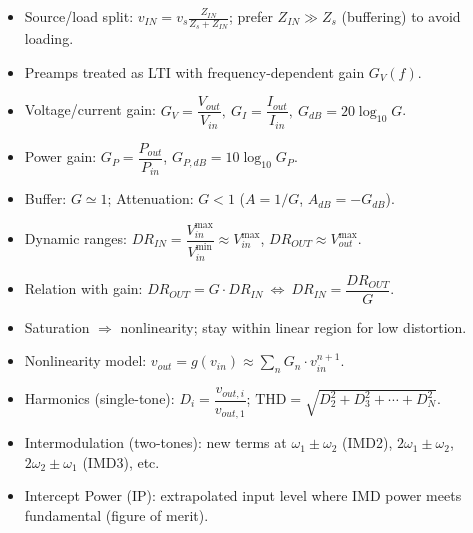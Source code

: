 \begin{tcolorbox}[colback=gray!10,colframe=black,title=Summary: Audio Path & Impedance]
\begin{itemize}
\item Source/load split: $\displaystyle v_{IN}=v_s\frac{Z_{IN}}{Z_s+Z_{IN}}$; prefer $Z_{IN}\gg Z_s$ (buffering) to avoid loading.
\item Preamps treated as LTI with frequency-dependent gain $G_V(f)$.
\end{itemize}
\end{tcolorbox}

\begin{tcolorbox}[colback=gray!10,colframe=black,title=Summary: Gains & dB]
\begin{itemize}
\item Voltage/current gain: $G_V=\dfrac{V_{out}}{V_{in}}, \ G_I=\dfrac{I_{out}}{I_{in}}, \ G_{dB}=20\log_{10}G$.
\item Power gain: $G_P=\dfrac{P_{out}}{P_{in}}$, $G_{P,dB}=10\log_{10}G_P$.
\item Buffer: $G\simeq1$; Attenuation: $G<1$ ($A=1/G$, $A_{dB}=-G_{dB}$).
\end{itemize}
\end{tcolorbox}

\begin{tcolorbox}[colback=gray!10,colframe=black,title=Summary: Dynamic Range & Saturation]
\begin{itemize}
\item Dynamic ranges: $DR_{IN}=\dfrac{V_{in}^{\max}}{V_{in}^{\min}}\approx V_{in}^{\max}$, 
$DR_{OUT}\approx V_{out}^{\max}$.
\item Relation with gain: $DR_{OUT}=G\cdot DR_{IN} \ \Leftrightarrow \ DR_{IN}=\dfrac{DR_{OUT}}{G}$.
\item Saturation $\Rightarrow$ nonlinearity; stay within linear region for low distortion.
\end{itemize}
\end{tcolorbox}

\begin{tcolorbox}[colback=gray!10,colframe=black,title=Summary: Distortion, THD & IMD]
\begin{itemize}
\item Nonlinearity model: $v_{out}=g(v_{in})\approx \sum_{n}G_n \cdot v_{in}^{n+1}$.
\item Harmonics (single-tone): $D_i=\dfrac{v_{out,i}}{v_{out,1}}$; $\displaystyle \mathrm{THD}=\sqrt{D_2^2+D_3^2+\cdots+ D_N^2}$.
\item Intermodulation (two-tones): new terms at $\omega_1\pm\omega_2$ (IMD2), $2\omega_1\pm\omega_2$, $2\omega_2\pm\omega_1$ (IMD3), etc.
\item Intercept Power (IP): extrapolated input level where IMD power meets fundamental (figure of merit).
\end{itemize}
\end{tcolorbox}

